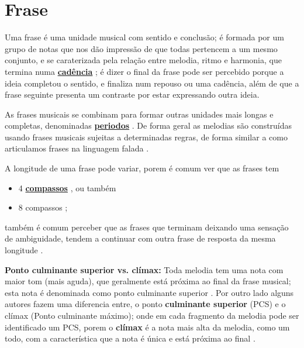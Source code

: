 \section{Frase}
\label{sec:Frase}
Uma frase é uma unidade musical com sentido e conclusão;
é formada por um grupo de notas que nos dão impressão de que todas pertencem a um mesmo conjunto,
e se caraterizada pela relação entre melodia, ritmo e harmonia,
que termina numa \hyperref[sec:Cadencia]{\textbf{cadência}} \cite[pp. 624]{latham2008diccionario} \cite[pp. 335]{medteoria} \cite[pp. 34]{bennett1993elementos};
é dizer o final da frase pode ser percebido porque a ideia completou o sentido, 
e finaliza num repouso ou uma cadência, além de que a frase seguinte presenta um contraste por estar expressando outra ideia.


As frases musicais se combinam para formar outras unidades mais longas e completas, 
denominadas \hyperref[sec:Periodo]{\textbf{periodos}} \cite[pp. 624]{latham2008diccionario}.
De forma geral as melodias são construídas usando frases musicais sujeitas a determinadas
regras, de forma similar a como articulamos frases na linguagem falada \cite[pp. 334]{medteoria}.


A longitude de uma frase pode variar, 
porem é comum ver que as frases tem
\begin{itemize}
\item 4 \hyperref[sec:compaso]{\textbf{compassos}} \cite[pp. 624]{latham2008diccionario} \cite[pp. 34]{bennett1993elementos}, 
ou também 
\item 8 compassos  \cite[pp. 335]{medteoria} \cite[pp. 34]{bennett1993elementos};
\end{itemize}
também é comum perceber que as frases que terminam deixando uma sensação de ambiguidade, 
tendem a continuar com outra frase de resposta da mesma longitude \cite[pp. 624]{latham2008diccionario}.


\begin{tcbinformation}
\label{ref:PontoCulminanteSuperior} 
\textbf{Ponto culminante superior vs. clímax:}
Toda melodia tem uma nota com maior tom (mais aguda), que geralmente está próxima ao final da frase musical;
esta nota é denominada como ponto culminante superior \cite[pp. 336]{medteoria}.
Por outro lado alguns autores fazem uma diferencia entre,
o ponto \textbf{culminante superior} (PCS) e o clímax (Ponto culminante máximo);
onde em cada fragmento da melodia pode ser identificado um PCS,
porem o \textbf{clímax} é a nota mais alta da melodia, como um todo, 
com a característica que a nota é única e está próxima ao final \cite[pp. 12]{melos2012} \cite{HARTMANN2013} \cite[pp. 50]{holland2013music}.
\label{ref:climax}
\end{tcbinformation} 

